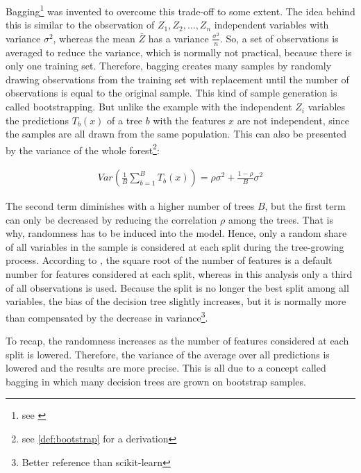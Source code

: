 \documentclass[12pt, a4paper, abstract, parskip]{scrartcl}
\theoremstyle{definition}
\begin{document}
Bagging\footnote{see \cite{breiman1996bagging}} was invented to overcome this
trade-off to some extent. The idea behind this is similar to the observation of
$Z_1, Z_2, \dots, Z_n$ independent variables with variance $\sigma^2$, whereas
the mean $\bar{Z}$ has a variance $\frac{\sigma^2}{n}$. So, a set of
observations is averaged to reduce the variance, which is normally not
practical, because there is only one training set. Therefore, bagging creates
many samples by randomly drawing observations from the training set with
replacement until the number of observations is equal to the original sample.
This kind of sample generation is called bootstrapping. But unlike the example
with the independent $Z_i$ variables the predictions $T_b(x)$ of a tree $b$
with the features $x$ are not independent, since the samples are all drawn from
the same population. This can also be presented by the variance of the whole
forest\footnote{see \ref{def:bootstrap} for a derivation}:

\begin{align*}
Var(\frac{1}{B}\sum^B_{b = 1} T_b(x)) = \rho\sigma^2 + \frac{1-\rho}{B}\sigma^2
\end{align*}

The second term diminishes with a higher number of trees $B$, but the first
term can only be decreased by reducing the correlation $\rho$ among the trees.
That is why, randomness has to be induced into the model. Hence, only a random
share of all variables in the sample is considered at each split during the
tree-growing process. According to \cite{friedman2009elements}, the square root
of the number of features is a default number for features considered at each
split, whereas in this analysis only a third of all observations is used.
Because the split is no longer the best split among all variables, the bias of
the decision tree slightly increases, but it is normally more than compensated
by the decrease in variance\footnote{Better reference than scikit-learn}.

To recap, the randomness increases as the number of features considered at each
split is lowered. Therefore, the variance of the average over all predictions
is lowered and the results are more precise. This is all due to a concept
called bagging in which many decision trees are grown on bootstrap samples.
\end{document}
